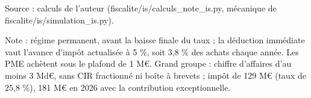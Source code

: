 Source : calculs de l'auteur (fiscalite/is/calculs\_note\_is.py, mécanique de fiscalite/is/simulation\_is.py).\par Note : régime permanent, avant la baisse finale du taux ; la déduction immédiate vaut l'avance d'impôt actualisée à 5 \%, soit 3,8 \% des achats chaque année. Les PME achètent sous le plafond de 1 M\euro{}. Grand groupe : chiffre d'affaires d'au moins 3 Md\euro{}, sans CIR fractionné ni boîte à brevets ; impôt de 129 M\euro{} (taux de 25,8 \%), 181 M\euro{} en 2026 avec la contribution exceptionnelle.

